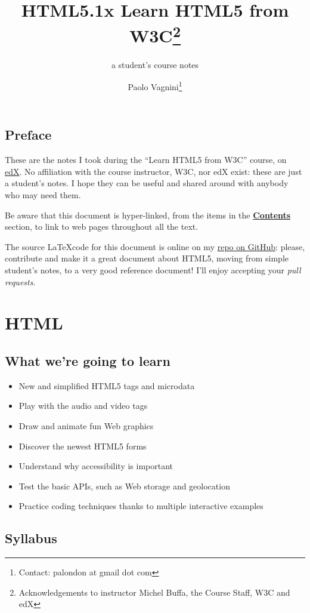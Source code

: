 \documentclass[a4paper,11pt]{book}
\title{HTML5.1x Learn HTML5 from W3C\thanks{Acknowledgements to
instructor Michel Buffa, the Course Staff, W3C and edX}}
\subtitle{a student's course notes}
\author{Paolo Vagnini\thanks{Contact: palondon at gmail dot com}}
\begin{document}
\maketitle
\hypertarget{toc}{} \tableofcontents

\chapter*{Preface}
These are the notes I took during the ``Learn HTML5 from W3C'' course,
on \href{http://www.edx.org}{edX}. No affiliation with the course instructor,
W3C, nor edX exist: these are just a student's notes.
I hope they can be useful and shared around with anybody who may need them.

Be aware that this document is hyper-linked, from the items in the
\hyperlink{toc}{\textbf{Contents}} section,
to link to web pages throughout all the text.

The source \LaTeX code for this document is online on my
\href{https://github.com/Pvag/HTML5_notes}{repo on GitHub}:
please, contribute and make it a great document about HTML5, moving from
simple student's notes, to a very good reference document! I'll enjoy
accepting your \textit{pull requests}.

\part{HTML}

\chapter{What we're going to learn}
\begin{itemize}
    \item New and simplified HTML5 tags and microdata
    \item Play with the audio and video tags
    \item Draw and animate fun Web graphics
    \item Discover the newest HTML5 forms
    \item Understand why accessibility is important
    \item Test the basic APIs, such as Web storage and geolocation
    \item Practice coding techniques thanks to multiple interactive examples
\end{itemize}

\chapter{Syllabus}
\end{document}
